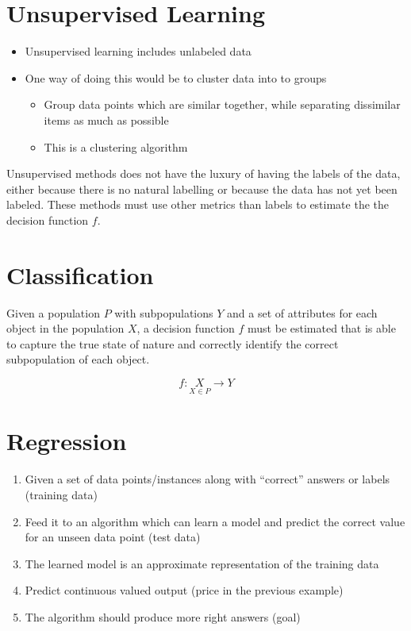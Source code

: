 \section{Unsupervised Learning}
\begin{itemize}
    \item Unsupervised learning includes unlabeled data
    \item One way of doing this would be to cluster data into to groups
    \begin{itemize}
        \item Group data points which are similar together, while separating 
        dissimilar items as much as possible
        \item This is a clustering algorithm
    \end{itemize}
\end{itemize}

Unsupervised methods does not have the luxury of having the labels of the data,
either because there is no natural labelling or because the data has not yet
been labeled. These methods must use other metrics than labels to estimate the
the decision function $f$. 

\section{Classification}

Given a population $P$ with subpopulations $Y$ and a set of attributes for 
each object in the population $X$, a decision function $f$ must be estimated 
that is able to capture the true state of nature and correctly identify
the correct subpopulation of each object. 

\begin{equation*}
    f: \underset{X \in P}{X} \rightarrow Y
\end{equation*}

\section{Regression}
\begin{enumerate}
    \item Given a set of data points/instances along with “correct” answers or 
    labels (training data)
    \item Feed it to an algorithm which can learn a model and predict the 
    correct value for an unseen data point (test data)
    \item The learned model is an approximate representation of the training 
    data
    \item Predict continuous valued output (price in the previous example)
    \item The algorithm should produce more right answers (goal)
\end{enumerate}


